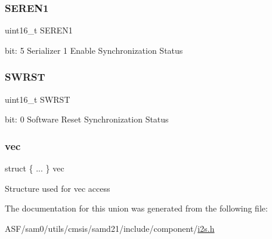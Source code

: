 \subsubsection{\texorpdfstring{SEREN1}{SEREN1}}
{\footnotesize\ttfamily uint16\+\_\+t S\+E\+R\+E\+N1}

bit\+: 5 Serializer 1 Enable Synchronization Status \mbox{\label{union_i2_s___s_y_n_c_b_u_s_y___type_a4987fcca11694bd2ffae6a773a9bfc24}} 
\subsubsection{\texorpdfstring{SWRST}{SWRST}}
{\footnotesize\ttfamily uint16\+\_\+t S\+W\+R\+ST}

bit\+: 0 Software Reset Synchronization Status \mbox{\label{union_i2_s___s_y_n_c_b_u_s_y___type_af58577b285f218af0f56cb8b99aadc65}} 
\subsubsection{\texorpdfstring{vec}{vec}}
{\footnotesize\ttfamily struct \{ ... \}   vec}

Structure used for vec access 

The documentation for this union was generated from the following file\+:\begin{DoxyCompactItemize}
\item 
A\+S\+F/sam0/utils/cmsis/samd21/include/component/\mbox{\hyperlink{component_2i2s_8h}{i2s.\+h}}\end{DoxyCompactItemize}
